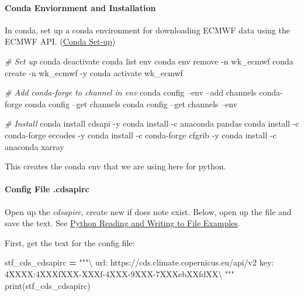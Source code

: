 \documentclass[
]{book}
\newenvironment{Shaded}{\begin{snugshade}}{\end{snugshade}}
\newcommand{\BuiltInTok}[1]{#1}
\newcommand{\CommentTok}[1]{\textcolor[rgb]{0.56,0.35,0.01}{\textit{#1}}}
\newcommand{\ExtensionTok}[1]{#1}
\newcommand{\NormalTok}[1]{#1}
\newcommand{\OperatorTok}[1]{\textcolor[rgb]{0.81,0.36,0.00}{\textbf{#1}}}
\newcommand{\StringTok}[1]{\textcolor[rgb]{0.31,0.60,0.02}{#1}}
\begin{document}
\hypertarget{conda-enviornment-and-installation}{%
\paragraph{Conda Enviornment and Installation}\label{conda-enviornment-and-installation}}

In conda, set up a conda environment for downloading ECMWF data using the ECMWF API. (\href{https://fanwangecon.github.io/Tex4Econ/nontex/install/windows/fn_installations.html}{Conda Set-up})

\begin{Shaded}
\begin{Highlighting}[]
\CommentTok{# Set up}
\ExtensionTok{conda}\NormalTok{ deactivate}
\ExtensionTok{conda}\NormalTok{ list env}
\ExtensionTok{conda}\NormalTok{ env remove -n wk_ecmwf}
\ExtensionTok{conda}\NormalTok{ create -n wk_ecmwf -y}
\ExtensionTok{conda}\NormalTok{ activate wk_ecmwf}

\CommentTok{# Add conda-forge to channel in env}
\ExtensionTok{conda}\NormalTok{ config --env --add channels conda-forge}
\ExtensionTok{conda}\NormalTok{ config --get channels}
\ExtensionTok{conda}\NormalTok{ config --get channels --env}

\CommentTok{# Install}
\ExtensionTok{conda}\NormalTok{ install cdsapi -y}
\ExtensionTok{conda}\NormalTok{ install -c anaconda pandas}
\ExtensionTok{conda}\NormalTok{ install -c conda-forge eccodes -y}
\ExtensionTok{conda}\NormalTok{ install -c conda-forge cfgrib -y}
\ExtensionTok{conda}\NormalTok{ install -c anaconda xarray}
\end{Highlighting}
\end{Shaded}

This creates the conda env that we are using here for python.

\hypertarget{config-file-.cdsapirc}{%
\paragraph{Config File .cdsapirc}\label{config-file-.cdsapirc}}

Open up the \emph{cdsapirc}, create new if does note exist. Below, open up the file and save the text. See \href{https://fanwangecon.github.io/pyfan/vig/support/inout/htmlpdfr/fp_files.html}{Python Reading and Writing to File Examples}.

First, get the text for the config file:

\begin{Shaded}
\begin{Highlighting}[]
\NormalTok{stf_cds_cdsapirc }\OperatorTok{=} \StringTok{"""\textbackslash{}}
\StringTok{url: https://cds.climate.copernicus.eu/api/v2}
\StringTok{key: 4XXXX:4XXXfXXX-XXXf-4XXX-9XXX-7XXXebXXfdXX\textbackslash{}}
\StringTok{"""}
\BuiltInTok{print}\NormalTok{(stf_cds_cdsapirc)}
\end{Highlighting}
\end{Shaded}
\end{document}
